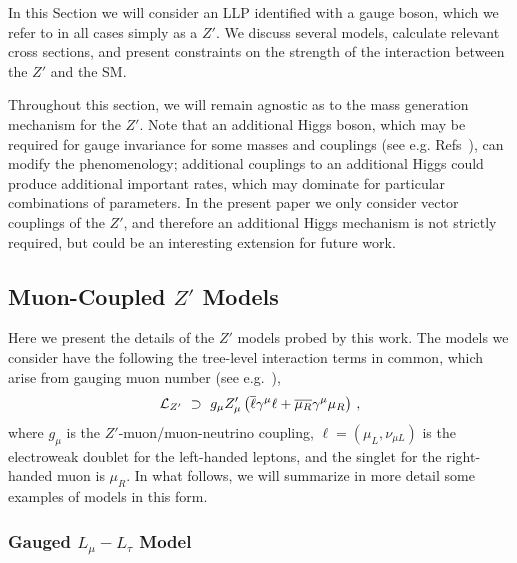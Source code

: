 \documentclass[11pt]{article}
\begin{document}
In this Section we will consider an LLP identified with a gauge boson, which we refer to in all cases simply as a $Z'$. We discuss several models, calculate relevant cross sections, and present constraints on the strength of the interaction between the $Z'$ and the SM.  

Throughout this section, we will remain agnostic as to the mass generation mechanism for the $Z'$. Note that an additional Higgs boson, which may be required for gauge invariance for some masses and couplings (see e.g. Refs~\cite{An:2013yua, Kahlhoefer:2015bea,Bell:2016fqf,Bell:2016uhg,Duerr:2016tmh,Bell:2017irk,Cui:2017juz}), can modify the phenomenology; additional couplings to an additional Higgs could produce additional important rates, which may dominate for particular combinations of parameters. In the present paper we only consider vector couplings of the $Z'$, and therefore an additional Higgs mechanism is not strictly required, but could be an interesting extension for future work.

\subsection{Muon-Coupled $Z'$ Models}

Here we present the details of the $Z'$ models probed by this work. The models we consider have the following the tree-level interaction terms in common, which arise from gauging muon number (see e.g.~\cite{Fox:2008kb,Kopp:2009et,Bell:2014tta, DEramo:2017zqw}), 
\begin{eqnarray}
 {\cal L}_{Z'} \,\, \supset \,\, g_{\mu}Z'_\mu\left(\overline{\ell}\gamma^\mu\ell+\overline{\mu_R}\gamma^\mu\mu_R\right)\,,
 \label{eq:lag1}
\end{eqnarray}
where $g_{\mu}$ is the $Z'$-muon/muon-neutrino coupling, $\ell=(\mu_L,\nu_{\mu L})$
is the electroweak doublet for the left-handed leptons, and the singlet for the right-handed muon is $\mu_R$. In what follows, we will summarize in more detail some examples of models in this form.

\subsubsection{Gauged $L_\mu-L_\tau$ Model}
\end{document}
